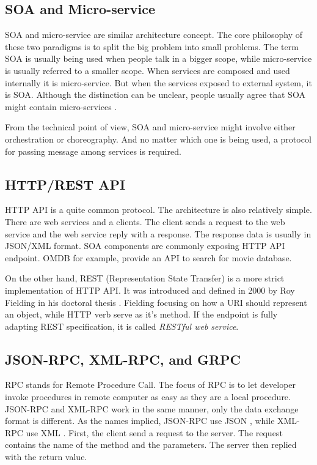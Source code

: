 \documentclass[conference]{IEEEtran}
\begin{document}
\subsection{SOA and Micro-service}

SOA and micro-service are similar architecture concept. The core philosophy of these two paradigms is to split the big problem into small problems. The term SOA is usually being used when people talk in a bigger scope, while micro-service is usually referred to a smaller scope. When services are composed and used internally it is micro-service. But when the services exposed to external system, it is SOA. Although the distinction can be unclear, people usually agree that SOA might contain micro-services \cite{soavsmicroservice}.

From the technical point of view, SOA and micro-service might involve either orchestration or choreography. And no matter which one is being used, a protocol for passing message among services is required.

\subsection{HTTP/REST API}

HTTP API is a quite common protocol. The architecture is also relatively simple. There are web services and a clients. The client sends a request to the web service and the web service reply with a response. The response data is usually in JSON/XML format. SOA components are commonly exposing HTTP API endpoint. OMDB for example, provide an API to search for movie database.

On the other hand, REST (Representation State Transfer) is a more strict implementation of HTTP API. It was introduced and defined in 2000 by Roy Fielding in his doctoral thesis \cite{Fielding:2000:PDM:337180.337228}. Fielding focusing on how a URI should represent an object, while HTTP verb serve as it's method. If the endpoint is fully adapting REST specification, it is called {\it RESTful web service}.

\subsection{JSON-RPC, XML-RPC, and GRPC}

RPC stands for Remote Procedure Call. The focus of RPC is to let developer invoke procedures in remote computer as easy as they are a local procedure. JSON-RPC and XML-RPC work in the same manner, only the data exchange format is different. As the names implied, JSON-RPC use JSON \cite{jsonrpc}, while XML-RPC use XML \cite{xmlrpc}. First, the client send a request to the server. The request contains the name of the method and the parameters. The server then replied with the return value.
\end{document}
